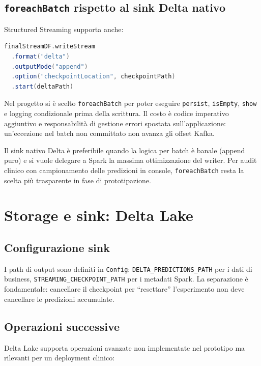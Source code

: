 \subsection{\texttt{foreachBatch} rispetto al sink Delta nativo}\label{subsec:foreach-vs-delta}

Structured Streaming supporta anche:

\begin{lstlisting}[language=Scala,caption={Alternativa dichiarativa (non usata nel prototipo).}]
finalStreamDF.writeStream
  .format("delta")
  .outputMode("append")
  .option("checkpointLocation", checkpointPath)
  .start(deltaPath)
\end{lstlisting}

Nel progetto si è scelto \texttt{foreachBatch} per poter eseguire \texttt{persist}, \texttt{isEmpty}, \texttt{show} e logging condizionale prima della scrittura.
Il costo è codice imperativo aggiuntivo e responsabilità di gestione errori spostata sull'applicazione: un'eccezione nel batch non committato non avanza gli offset Kafka.

Il sink nativo Delta è preferibile quando la logica per batch è banale (append puro) e si vuole delegare a Spark la massima ottimizzazione del writer.
Per audit clinico con campionamento delle predizioni in console, \texttt{foreachBatch} resta la scelta più trasparente in fase di prototipazione.

\section{Storage e sink: Delta Lake}\label{sec:storage-delta}

\subsection{Configurazione sink}

I path di output sono definiti in \texttt{Config}:
\texttt{DELTA\_PREDICTIONS\_PATH} per i dati di business, \texttt{STREAMING\_CHECKPOINT\_PATH} per i metadati Spark.
La separazione è fondamentale: cancellare il checkpoint per ``resettare'' l'esperimento non deve cancellare le predizioni accumulate.

\subsection{Operazioni successive}

Delta Lake supporta operazioni avanzate non implementate nel prototipo ma rilevanti per un deployment clinico:

